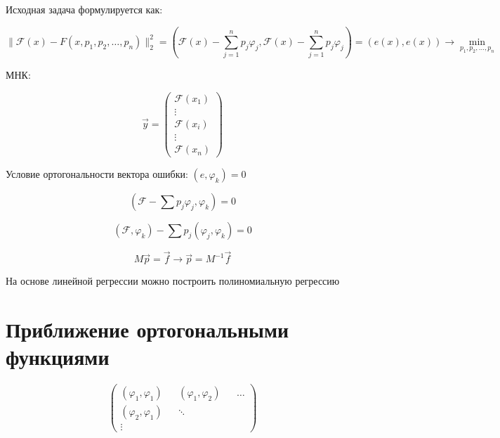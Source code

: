 \documentclass[10pt,a4paper]{article}
\begin{document}
 	Исходная задача формулируется как:
 	
 	\begin{equation}
 		\parallel\mathcal{F}\left(x\right) - F\left(x, p_{1}, p_{2}, \ldots, 
 		p_{n}\right)\parallel_{2}^{2} = \left(\mathcal{F}\left(x\right) - 
 		\sum \limits_{j = 1}^{n}p_{j}\varphi_{j},\mathcal{F}\left(x\right) - 
 		\sum \limits_{j = 1}^{n}p_{j}\varphi_{j}\right) = \left(e\left(x\right),
 		e\left(x\right)\right) \rightarrow \min\limits_{p_{1}, p_{2}, 
 		\ldots, p_{n}} 
 	\end{equation}
 	
 	МНК:
 	
 	\begin{equation}
 		\vec{y} = \begin{pmatrix}
 			\mathcal{F}\left(x_{1}\right) \\
 			\vdots \\
 			\mathcal{F}\left(x_{i}\right) \\
 			\vdots \\
 			\mathcal{F}\left(x_{n}\right) 
 			
 		\end{pmatrix}
 	\end{equation}
 	
 	Условие ортогональности вектора ошибки: $\left(e, \varphi_{k}\right) = 0$
 	
 	\begin{equation}
 		\left(\mathcal{F} - \sum p_{j}\varphi_{j}, \varphi_{k}\right) = 0
 	\end{equation}
 	
 	\begin{equation}
 		\left(\mathcal{F}, \varphi_{k}\right) - \sum p_{j}\left(\varphi_{j},
 		\varphi_{k}\right) = 0
 	\end{equation}
 	
 	\begin{equation}
 		M\vec{p} = \vec{f} \rightarrow \vec{p} = M^{-1}\vec{f}
 	\end{equation}
 	
 	На основе линейной регрессии можно построить полиномиальную регрессию
 	
 	\section{Приближение ортогональными функциями}
 	
 	\begin{equation}
 		\begin{pmatrix}
 			\left(\varphi_{1}, \varphi_{1}\right) &&
 			\left(\varphi_{1}, \varphi_{2}\right) && \ldots \\
 			\left(\varphi_{2}, \varphi_{1}\right) && \ddots \\
 			\vdots 
 		\end{pmatrix}
 	\end{equation}
 	
\end{document}

